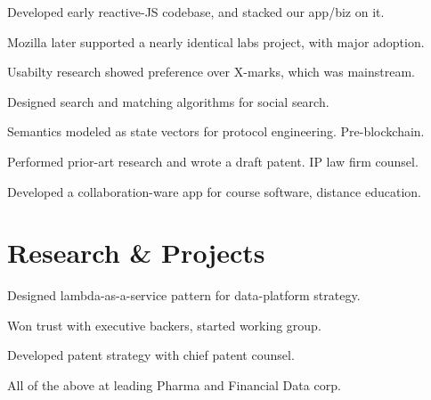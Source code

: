 \documentclass[letterpaper]{deedy-resume} %
\begin{document}
\begin{minipage}[t]{0.66\textwidth}
\begin{tightitemize}
\end{tightitemize}

\sectionspace %


\begin{tightitemize}
\item Developed early reactive-JS codebase, and stacked our app/biz on it. 
\item Mozilla later supported a nearly identical labs project, with major adoption.
\item Usabilty research showed preference over X-marks, which was mainstream.
\end{tightitemize}

\sectionspace %



\begin{tightitemize}
\item Designed search and matching algorithms for social search.
\item Semantics modeled as state vectors for protocol engineering.  Pre-blockchain.
\item Performed prior-art research and wrote a draft patent. IP law firm counsel.
\item Developed a collaboration-ware app for course software, distance education.
\end{tightitemize}

\sectionspace %



\section{Research \& Projects}



\begin{tightitemize}
\item Designed lambda-as-a-service pattern for data-platform strategy.
\item Won trust with executive backers, started working group.
\item Developed patent strategy with chief patent counsel.
\item All of the above at leading Pharma and Financial Data corp.
\end{tightitemize}


\end{minipage}
\end{document}
